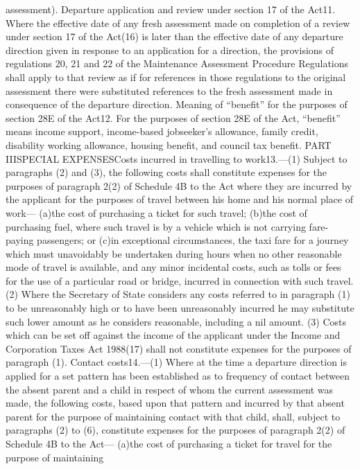 \documentclass[a4paper]{article}
\begin{document}
assessment).
Departure application and review under section 17 of the Act11. Where the
effective date of any fresh assessment made on completion of a review under
section 17 of the Act(16) is later than the effective date of any departure
direction given in response to an application for a direction, the provisions of
regulations 20, 21 and 22 of the Maintenance Assessment Procedure Regulations
shall apply to that review as if for references in those regulations to the
original assessment there were substituted references to the fresh assessment
made in consequence of the departure direction.
Meaning of “benefit” for the purposes of section 28E of the Act12. For the
purposes of section 28E of the Act, “benefit” means income support, income-based
jobseeker’s allowance, family credit, disability working allowance, housing
benefit, and council tax benefit.
PART IIISPECIAL EXPENSESCosts incurred in travelling to work13.—(1) Subject to
paragraphs (2) and (3), the following costs shall constitute expenses for the
purposes of paragraph 2(2) of Schedule 4B to the Act where they are incurred by
the applicant for the purposes of travel between his home and his normal place
of work—
(a)the cost of purchasing a ticket for such travel;
(b)the cost of purchasing fuel, where such travel is by a vehicle which is not
carrying fare-paying passengers; or
(c)in exceptional circumstances, the taxi fare for a journey which must
unavoidably be undertaken during hours when no other reasonable mode of travel
is available,
and any minor incidental costs, such as tolls or fees for the use of a
particular road or bridge, incurred in connection with such travel.
(2) Where the Secretary of State considers any costs referred to in paragraph
(1) to be unreasonably high or to have been unreasonably incurred he may
substitute such lower amount as he considers reasonable, including a nil amount.
(3) Costs which can be set off against the income of the applicant under the
Income and Corporation Taxes Act 1988(17) shall not constitute expenses for the
purposes of paragraph (1).
Contact costs14.—(1) Where at the time a departure direction is applied for a
set pattern has been established as to frequency of contact between the absent
parent and a child in respect of whom the current assessment was made, the
following costs, based upon that pattern and incurred by that absent parent for
the purpose of maintaining contact with that child, shall, subject to paragraphs
(2) to (6), constitute expenses for the purposes of paragraph 2(2) of Schedule
4B to the Act—
(a)the cost of purchasing a ticket for travel for the purpose of maintaining
\end{document}
